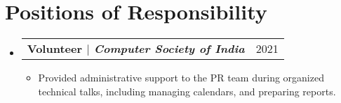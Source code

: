 \documentclass[letterpaper,11pt]{article}
\makeatletter
\newcommand{\resumeItem}[1]{
  \item\small{
    {#1 \vspace{-2pt}}
  }
}
\newcommand{\resumeSubheading}[4]{
  \vspace{-2pt}\item
    \begin{tabular*}{0.97\textwidth}[t]{l@{\extracolsep{\fill}}r}
      \textbf{#1} & #2 \\
      \textit{\small#3} & \textit{\small #4} \\
    \end{tabular*}\vspace{-9pt}
}
\newcommand{\resumeProjectHeading}[2]{
    \item
    \begin{tabular*}{0.97\textwidth}{l@{\extracolsep{\fill}}r}
      \small#1 & #2 \\
    \end{tabular*}\vspace{-6pt}
}
\newcommand{\resumeSubHeadingListStart}{\begin{itemize}[leftmargin=0.15in, label={}]}
\newcommand{\resumeSubHeadingListEnd}{\end{itemize}}
\newcommand{\resumeItemListStart}{\begin{itemize}}
\newcommand{\resumeItemListEnd}{\end{itemize}\vspace{-6pt}}
\makeatother
\begin{document}


\section{Positions of Responsibility}
  \resumeSubHeadingListStart
      \resumeProjectHeading
          {\textbf{Volunteer $|$ \emph{Computer Society of India}  } 
          }{2021}
          \resumeItemListStart
            \resumeItem{Provided administrative support to the PR team during organized technical talks, including managing calendars, and preparing reports.}
          \resumeItemListEnd
    \resumeSubHeadingListEnd

\end{document}
